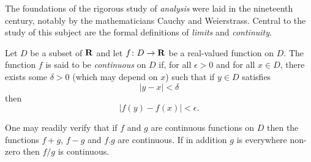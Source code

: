 The foundations of the rigorous study of {\it analysis}
were laid in the nineteenth century, notably by the
mathematicians Cauchy and Weierstrass. Central to the
study of this subject are the formal definitions of
{\it limits} and {\it continuity}.

Let $D$ be a subset of $\bf R$ and let
$f \colon D \to {\bf R}$ be a real-valued function on
$D$. The function $f$ is said to be {\it continuous} on
$D$ if, for all $\epsilon > 0$ and for all $x \in D$,
there exists some $\delta > 0$ (which may depend on $x$)
such that if $y \in D$ satisfies
$$|y - x| < \delta$$
then
$$|f(y) - f(x)| < \epsilon.$$

One may readily verify that if $f$ and $g$ are continuous
functions on $D$ then the functions $f+g$, $f-g$ and
$f.g$ are continuous. If in addition $g$ is everywhere
non-zero then $f/g$ is continuous.
\bye

